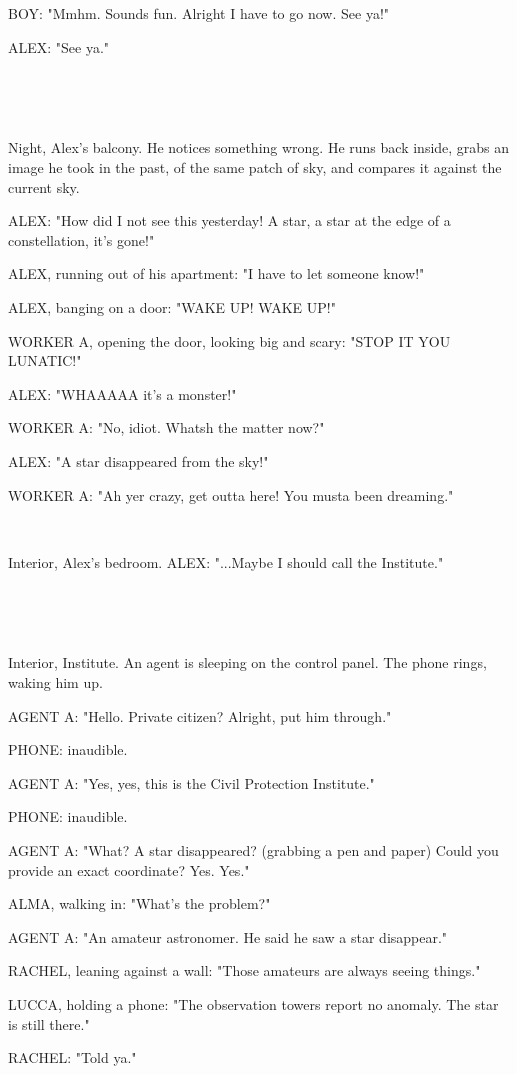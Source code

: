 \documentclass[11pt]{article}
\begin{document}
BOY: "Mmhm. Sounds fun.
Alright I have to go now. See ya!"

ALEX: "See ya."

\ 

\ 

Night, Alex's balcony.
He notices something wrong.
He runs back inside, grabs an image he took in the past, of the same patch of sky, and compares it against the current sky. 

ALEX: "How did I not see this yesterday!
A star, a star at the edge of a constellation, it's gone!"

ALEX, running out of his apartment: "I have to let someone know!"

ALEX, banging on a door: "WAKE UP! WAKE UP!"

WORKER A, opening the door, looking big and scary: "STOP IT YOU LUNATIC!"

ALEX: "WHAAAAA it's a monster!"

WORKER A: "No, idiot.
Whatsh the matter now?"

ALEX: "A star disappeared from the sky!"

WORKER A: "Ah yer crazy, get outta here!
You musta been dreaming."

\ 

Interior, Alex's bedroom.
ALEX: "...Maybe I should call the Institute."

\ 

\ 

Interior, Institute. 
An agent is sleeping on the control panel.
The phone rings, waking him up.

AGENT A: "Hello. Private citizen? Alright, put him through."

PHONE: inaudible.

AGENT A: "Yes, yes, this is the Civil Protection Institute."

PHONE: inaudible. 

AGENT A: "What? A star disappeared?
(grabbing a pen and paper)
Could you provide an exact coordinate?
Yes. Yes."

ALMA, walking in: "What's the problem?"

AGENT A: "An amateur astronomer. He said he saw a star disappear."

RACHEL, leaning against a wall: "Those amateurs are always seeing things."

LUCCA, holding a phone: "The observation towers report no anomaly. 
The star is still there."

RACHEL: "Told ya."
\end{document}
